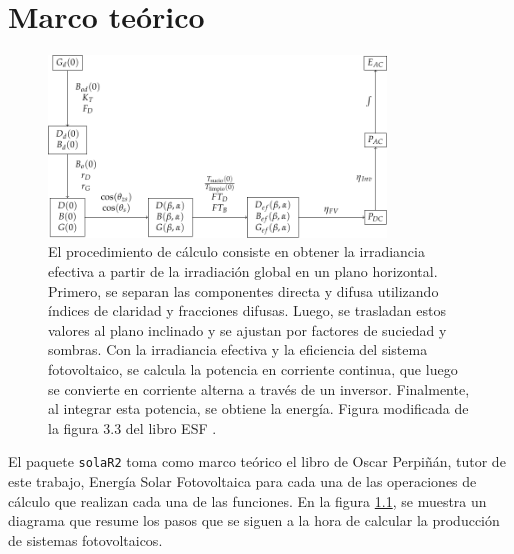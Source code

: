 \chapter{Marco teórico}
\label{chap:marco-teorico}
\begin{figure}[H]
\centering
\includegraphics[width=0.8\textwidth]{figuras/ProcedimientoCalculoRadiacionInclinada.pdf}
\caption{\label{fig:org5680b9d}El procedimiento de cálculo consiste en obtener la irradiancia efectiva a partir de la irradiación global en un plano horizontal. Primero, se separan las componentes directa y difusa utilizando índices de claridad y fracciones difusas. Luego, se trasladan estos valores al plano inclinado y se ajustan por factores de suciedad y sombras. Con la irradiancia efectiva y la eficiencia del sistema fotovoltaico, se calcula la potencia en corriente continua, que luego se convierte en corriente alterna a través de un inversor. Finalmente, al integrar esta potencia, se obtiene la energía. Figura modificada de la figura 3.3 del libro ESF \cite{Perpinan2023}.}
\end{figure}


El paquete \texttt{solaR2} toma como marco teórico el libro de Oscar Perpiñán, tutor de este trabajo, Energía Solar Fotovoltaica \cite{Perpinan2023} para cada una de las operaciones de cálculo que realizan cada una de las funciones.
En la figura \ref{fig:org5680b9d}, se muestra un diagrama que resume los pasos que se siguen a la hora de calcular la producción de sistemas fotovoltaicos.

\FloatBarrier

